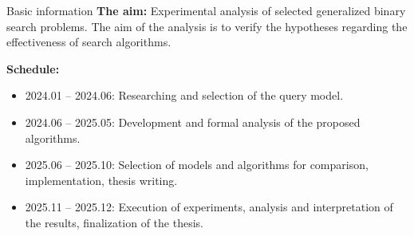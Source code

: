 
\begin{frame}{Basic information}
	\textbf{The aim:} Experimental analysis of selected generalized binary search problems. The aim of the analysis is to verify the hypotheses regarding the effectiveness of search algorithms. 
    
    \textbf{Schedule:}
    \begin{itemize}
    \pause
    \item 2024.01 -- 2024.06: Researching and selection of the query model.
    \item 2024.06 -- 2025.05: Development and formal analysis of the proposed algorithms.
    \item 2025.06 -- 2025.10: Selection of models and algorithms for comparison, implementation, thesis writing.
    \item 2025.11 -- 2025.12: Execution of experiments, analysis and interpretation of the results, finalization of the thesis.

\end{itemize}
\end{frame}

